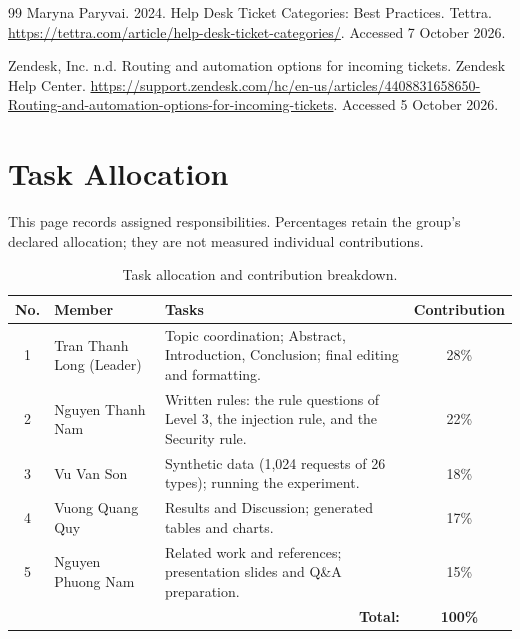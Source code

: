 \documentclass[sigconf,nonacm]{acmart}
\begin{document}
\begin{thebibliography}{99}
Maryna Paryvai. 2024.
\newblock Help Desk Ticket Categories: Best Practices.
\newblock Tettra. \url{https://tettra.com/article/help-desk-ticket-categories/}. Accessed 7 October 2026.

Zendesk, Inc. n.d.
\newblock Routing and automation options for incoming tickets.
\newblock Zendesk Help Center. \url{https://support.zendesk.com/hc/en-us/articles/4408831658650-Routing-and-automation-options-for-incoming-tickets}. Accessed 5 October 2026.

\end{thebibliography}

\clearpage
\onecolumn
\section*{Task Allocation}

This page records assigned responsibilities. Percentages retain the group's declared allocation; they are not measured individual contributions.

\begin{table}[h]
\centering
\caption{Task allocation and contribution breakdown.}
\renewcommand{\arraystretch}{1.4}
\begin{tabular}{|c|p{4.0cm}|p{8.7cm}|c|}
\hline
\textbf{No.} & \textbf{Member} & \textbf{Tasks} & \textbf{Contribution} \\
\hline
1 & Tran Thanh Long (Leader) & Topic coordination; Abstract, Introduction, Conclusion; final editing and formatting. & 28\% \\
\hline
2 & Nguyen Thanh Nam & Written rules: the rule questions of Level 3, the injection rule, and the Security rule. & 22\% \\
\hline
3 & Vu Van Son & Synthetic data (1,024 requests of 26 types); running the experiment. & 18\% \\
\hline
4 & Vuong Quang Quy & Results and Discussion; generated tables and charts. & 17\% \\
\hline
5 & Nguyen Phuong Nam & Related work and references; presentation slides and Q\&A preparation. & 15\% \\
\hline
\multicolumn{3}{|r|}{\textbf{Total:}} & \textbf{100\%} \\
\hline
\end{tabular}
\end{table}
\end{document}
